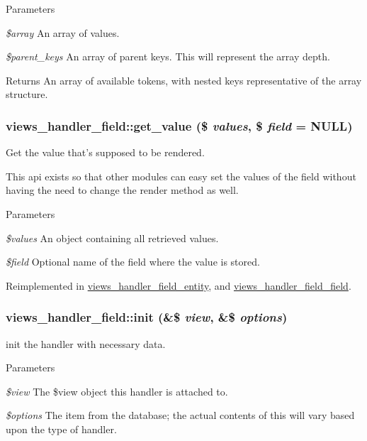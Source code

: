 \begin{DoxyParams}{Parameters}
\item[{\em \$array}]An array of values.\item[{\em \$parent\_\-keys}]An array of parent keys. This will represent the array depth.\end{DoxyParams}
\begin{DoxyReturn}{Returns}
An array of available tokens, with nested keys representative of the array structure. 
\end{DoxyReturn}
\hypertarget{classviews__handler__field_a293517c0221b4c11e5c353e518a271c4}{
\subsubsection[{get\_\-value}]{\setlength{\rightskip}{0pt plus 5cm}views\_\-handler\_\-field::get\_\-value (\$ {\em values}, \/  \$ {\em field} = {\ttfamily NULL})}}
\label{classviews__handler__field_a293517c0221b4c11e5c353e518a271c4}
Get the value that's supposed to be rendered.

This api exists so that other modules can easy set the values of the field without having the need to change the render method as well.


\begin{DoxyParams}{Parameters}
\item[{\em \$values}]An object containing all retrieved values. \item[{\em \$field}]Optional name of the field where the value is stored. \end{DoxyParams}


Reimplemented in \hyperlink{classviews__handler__field__entity_a79bd099a54975a492106311242054ccb}{views\_\-handler\_\-field\_\-entity}, and \hyperlink{classviews__handler__field__field_a0f3c7e4a7197b2cc7d06e5a489012a8a}{views\_\-handler\_\-field\_\-field}.\hypertarget{classviews__handler__field_a3a290c7df3ead81e5cd244ad5335b1cc}{
\subsubsection[{init}]{\setlength{\rightskip}{0pt plus 5cm}views\_\-handler\_\-field::init (\&\$ {\em view}, \/  \&\$ {\em options})}}
\label{classviews__handler__field_a3a290c7df3ead81e5cd244ad5335b1cc}
init the handler with necessary data. 
\begin{DoxyParams}{Parameters}
\item[{\em \$view}]The \$view object this handler is attached to. \item[{\em \$options}]The item from the database; the actual contents of this will vary based upon the type of handler. \end{DoxyParams}


